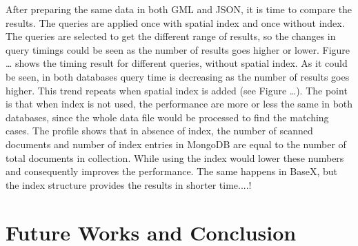 \documentclass[a4paper,12pt]{article}
\begin{document}
After preparing the same data in both GML and JSON, it is time to compare the results. The queries are applied once with spatial index and once without index. The queries are selected to get the different range of results, so the changes in query timings could be seen as the number of results goes higher or lower. Figure … shows the timing result for different queries, without spatial index. 
As it could be seen, in both databases query time is decreasing as the number of results goes higher. This trend repeats when spatial index is added (see Figure …). The point is that when index is not used, the performance are more or less the same in both databases, since the whole data file would be processed to find the matching cases. The profile shows that in absence of index, the number of  scanned documents and number of index entries in MongoDB are equal to the number of total documents in collection. While using the index would lower these numbers and consequently improves the performance. The same happens in BaseX, but the index structure provides the results in shorter time....!






\newpage
\section{Future Works and Conclusion}
\newpage


\end{document}
